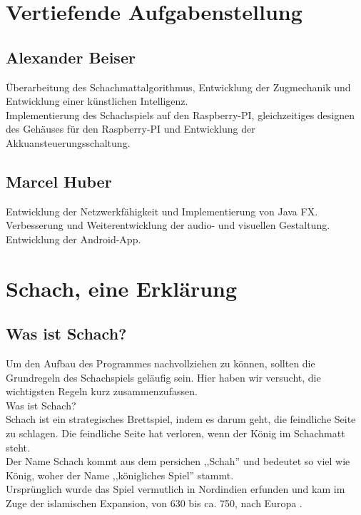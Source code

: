 \documentclass[12pt,a4paper]{article}
\begin{document}
{\section{\sc Vertiefende Aufgabenstellung}
 \subsection{Alexander Beiser}
 	Überarbeitung des Schachmattalgorithmus, Entwicklung der Zugmechanik und Entwicklung einer künstlichen Intelligenz. \\
Implementierung des Schachspiels auf den Raspberry-PI, gleichzeitiges designen des Gehäuses für den Raspberry-PI und Entwicklung der Akkuansteuerungsschaltung. 
	
 \subsection{Marcel Huber}
	Entwicklung der Netzwerkfähigkeit und Implementierung von Java FX.
Verbesserung und Weiterentwicklung der audio- und visuellen Gestaltung.
Entwicklung der Android-App.


\clearpage\vfill\newpage{}

\section{Schach, eine Erklärung}
\label{SEC:CHESS}

\subsection{Was ist Schach?}
\label{SUBSEC:CHESS-EXPLAIN}
Um den Aufbau des Programmes nachvollziehen zu können, sollten die Grundregeln des Schachspiels geläufig sein. Hier haben wir versucht, die wichtigsten Regeln kurz zusammenzufassen. \\
Was ist Schach? \\
Schach ist ein strategisches Brettspiel, indem es darum geht, die feindliche Seite zu schlagen. Die feindliche Seite hat verloren, wenn der König im Schachmatt steht. \\
Der Name Schach kommt aus dem persichen ,,Schah'' und bedeutet so viel wie König, woher der Name ,,königliches Spiel'' stammt. \\
Ursprünglich wurde das Spiel vermutlich in Nordindien erfunden und kam im Zuge der islamischen Expansion, von 630 bis ca. 750, nach Europa \cite{wiki:chess}.


}
\end{document}
